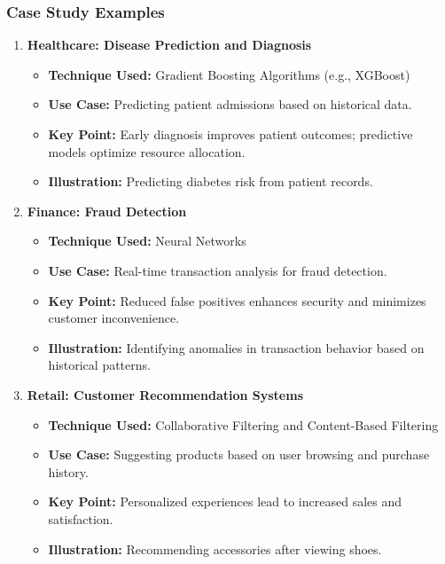 \documentclass[aspectratio=169]{beamer}
\begin{document}
\begin{frame}[fragile]
    \frametitle{Case Study Examples}
    \begin{enumerate}
        \item \textbf{Healthcare: Disease Prediction and Diagnosis}
            \begin{itemize}
                \item \textbf{Technique Used:} Gradient Boosting Algorithms (e.g., XGBoost)
                \item \textbf{Use Case:} Predicting patient admissions based on historical data.
                \item \textbf{Key Point:} Early diagnosis improves patient outcomes; predictive models optimize resource allocation.
                \item \textbf{Illustration:} Predicting diabetes risk from patient records.
            \end{itemize}

        \item \textbf{Finance: Fraud Detection}
            \begin{itemize}
                \item \textbf{Technique Used:} Neural Networks
                \item \textbf{Use Case:} Real-time transaction analysis for fraud detection.
                \item \textbf{Key Point:} Reduced false positives enhances security and minimizes customer inconvenience.
                \item \textbf{Illustration:} Identifying anomalies in transaction behavior based on historical patterns.
            \end{itemize}

        \item \textbf{Retail: Customer Recommendation Systems}
            \begin{itemize}
                \item \textbf{Technique Used:} Collaborative Filtering and Content-Based Filtering
                \item \textbf{Use Case:} Suggesting products based on user browsing and purchase history.
                \item \textbf{Key Point:} Personalized experiences lead to increased sales and satisfaction.
                \item \textbf{Illustration:} Recommending accessories after viewing shoes.
            \end{itemize}
    \end{enumerate}
\end{frame}
\end{document}
